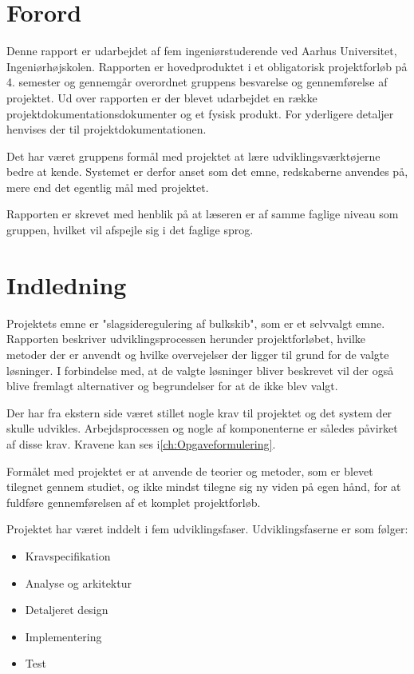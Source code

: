 \chapter{Forord}
\label{ch:forord}
Denne rapport er udarbejdet af fem ingeniørstuderende ved Aarhus Universitet, Ingeniørhøjskolen. Rapporten er hovedproduktet i et obligatorisk projektforløb på 4. semester og gennemgår overordnet gruppens besvarelse og gennemførelse af projektet. Ud over rapporten er der blevet udarbejdet en række projektdokumentationsdokumenter og et fysisk produkt. For yderligere detaljer henvises der til projektdokumentationen.

Det har været gruppens formål med projektet at lære udviklingsværktøjerne bedre at kende. Systemet er derfor anset som det emne, redskaberne anvendes på, mere end det egentlig mål med projektet.
 
Rapporten er skrevet med henblik på at læseren er af samme faglige niveau som gruppen, hvilket vil afspejle sig i det faglige sprog. 

\chapter{Indledning}
Projektets emne er "slagsideregulering af bulkskib", som er et selvvalgt emne. Rapporten beskriver udviklingsprocessen herunder projektforløbet, hvilke metoder der er anvendt og hvilke overvejelser der ligger til grund for de valgte løsninger. I forbindelse med, at de valgte løsninger bliver beskrevet vil der også blive fremlagt alternativer og begrundelser for at de ikke blev valgt. 

Der har fra ekstern side været stillet nogle krav til projektet og det system der skulle udvikles. Arbejdsprocessen og nogle af komponenterne er således påvirket af disse krav. Kravene kan ses i\ref{ch:Opgaveformulering}.

Formålet med projektet er at anvende de teorier og metoder, som er blevet tilegnet gennem studiet, og ikke mindst tilegne sig ny viden på egen hånd, for at fuldføre gennemførelsen af et komplet projektforløb.

Projektet har været inddelt i fem udviklingsfaser. Udviklingsfaserne er som følger:
\begin{itemize}
\item Kravspecifikation
\item Analyse og arkitektur
\item Detaljeret design
\item Implementering
\item Test
\end{itemize}



